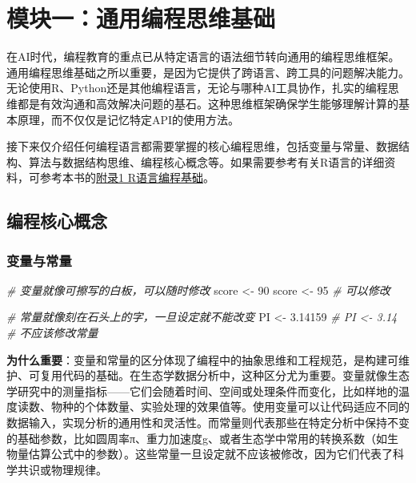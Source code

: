 \documentclass[
]{book}
\newenvironment{Shaded}{\begin{snugshade}}{\end{snugshade}}
\newcommand{\CommentTok}[1]{\textcolor[rgb]{0.56,0.35,0.01}{\textit{#1}}}
\newcommand{\DecValTok}[1]{\textcolor[rgb]{0.00,0.00,0.81}{#1}}
\newcommand{\FloatTok}[1]{\textcolor[rgb]{0.00,0.00,0.81}{#1}}
\newcommand{\NormalTok}[1]{#1}
\newcommand{\OtherTok}[1]{\textcolor[rgb]{0.56,0.35,0.01}{#1}}
\begin{document}
\hypertarget{ux6a21ux5757ux4e00ux901aux7528ux7f16ux7a0bux601dux7ef4ux57faux7840}{%
\section{模块一：通用编程思维基础}\label{ux6a21ux5757ux4e00ux901aux7528ux7f16ux7a0bux601dux7ef4ux57faux7840}}

在AI时代，编程教育的重点已从特定语言的语法细节转向通用的编程思维框架。通用编程思维基础之所以重要，是因为它提供了跨语言、跨工具的问题解决能力。无论使用R、Python还是其他编程语言，无论与哪种AI工具协作，扎实的编程思维都是有效沟通和高效解决问题的基石。这种思维框架确保学生能够理解计算的基本原理，而不仅仅是记忆特定API的使用方法。

接下来仅介绍任何编程语言都需要掌握的核心编程思维，包括变量与常量、数据结构、算法与数据结构思维、编程核心概念等。如果需要参考有关R语言的详细资料，可参考本书的\protect\hyperlink{ux9644ux5f551-rux8bedux8a00ux7f16ux7a0bux57faux7840}{附录1 R语言编程基础}。

\hypertarget{ux7f16ux7a0bux6838ux5fc3ux6982ux5ff5}{%
\subsection{编程核心概念}\label{ux7f16ux7a0bux6838ux5fc3ux6982ux5ff5}}

\hypertarget{ux53d8ux91cfux4e0eux5e38ux91cf}{%
\subsubsection{变量与常量}\label{ux53d8ux91cfux4e0eux5e38ux91cf}}

\begin{Shaded}
\begin{Highlighting}[]
\CommentTok{\# 变量就像可擦写的白板，可以随时修改}
\NormalTok{score }\OtherTok{\textless{}{-}} \DecValTok{90}
\NormalTok{score }\OtherTok{\textless{}{-}} \DecValTok{95}  \CommentTok{\# 可以修改}

\CommentTok{\# 常量就像刻在石头上的字，一旦设定就不能改变}
\NormalTok{PI }\OtherTok{\textless{}{-}} \FloatTok{3.14159}
\CommentTok{\# PI \textless{}{-} 3.14  \# 不应该修改常量}
\end{Highlighting}
\end{Shaded}

\textbf{为什么重要}：变量和常量的区分体现了编程中的抽象思维和工程规范，是构建可维护、可复用代码的基础。在生态学数据分析中，这种区分尤为重要。变量就像生态学研究中的测量指标------它们会随着时间、空间或处理条件而变化，比如样地的温度读数、物种的个体数量、实验处理的效果值等。使用变量可以让代码适应不同的数据输入，实现分析的通用性和灵活性。而常量则代表那些在特定分析中保持不变的基础参数，比如圆周率π、重力加速度g、或者生态学中常用的转换系数（如生物量估算公式中的参数）。这些常量一旦设定就不应该被修改，因为它们代表了科学共识或物理规律。
\end{document}
